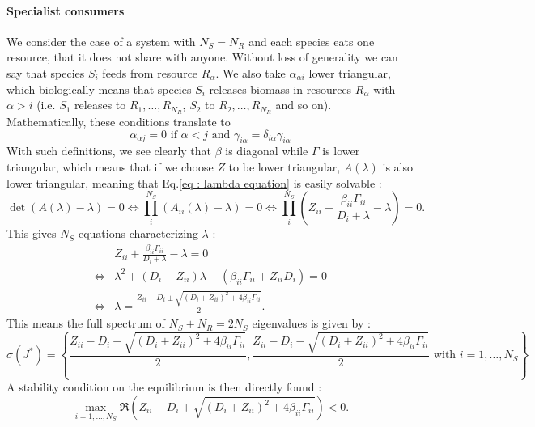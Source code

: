 \documentclass[12pt, titlepage]{report}
\begin{document}
		\paragraph{Specialist consumers} We consider the case of a system with $N_S = N_R$ and each species eats one resource, that it does not share with anyone. Without loss of generality we can say that species $S_i$ feeds from resource $R_\alpha$. We also take $\alpha_{\alpha i}$ lower triangular, which biologically means that species $S_i$ releases biomass in resources $R_\alpha$ with $\alpha > i$ (i.e. $S_1$ releases to $R_1, \dots, R_{N_R}$, $S_2$ to $R_2, \dots, R_{N_R}$ and so on). Mathematically, these conditions translate to
		\begin{equation}
			\alpha_{\alpha j} = 0 \text{ if } \alpha < j \text{ and } \gamma_{i\alpha} = \delta_{i\alpha} \gamma_{i\alpha}
		\end{equation}
		With such definitions, we see clearly that $\beta$ is diagonal while $\Gamma$ is lower triangular, which means that if we choose $Z$ to be lower triangular, $A(\lambda)$ is also lower triangular, meaning that Eq.\eqref{eq : lambda equation} is easily solvable :
		\begin{equation}
		\det\left(A(\lambda)-\lambda\right) = 0 \iff \prod_i^{N_S} \left(A_{ii}(\lambda)-\lambda\right)=0 \iff \prod_i^{N_S}\left(Z_{ii}+\frac{\beta_{ii}\Gamma_{ii}}{D_i + \lambda}-\lambda\right)=0.
		\end{equation}
		This gives $N_S$ equations characterizing $\lambda$ :
		\begin{align}
			& Z_{ii}+\frac{\beta_{ii}\Gamma_{ii}}{D_i + \lambda}-\lambda = 0 \\
			\iff & \lambda^2 + \left(D_i-Z_{ii}\right) \lambda-\left(\beta_{ii}\Gamma_{ii}+Z_{ii}D_i\right) = 0 \\
			\iff & \lambda = \frac{Z_{ii}-D_i \pm \sqrt{\left(D_i+Z_{ii}\right)^2 + 4 \beta_{ii} \Gamma_{ii}}}{2}.
		\end{align}
		This means the full spectrum of $N_S + N_R = 2 N_S$ eigenvalues is given by :
		\begin{equation}
			\sigma(J^*) = \left\{\frac{Z_{ii}-D_i + \sqrt{\left(D_i+Z_{ii}\right)^2 + 4 \beta_{ii} \Gamma_{ii}}}{2}, \frac{Z_{ii}-D_i - \sqrt{\left(D_i+Z_{ii}\right)^2 + 4 \beta_{ii} \Gamma_{ii}}}{2} \text{ with } i = 1, \dots, N_S\right\}
		\end{equation}
		A stability condition on the equilibrium is then directly found :
		\begin{equation}
			\max_{i = 1, \dots, N_S}\Re\left(Z_{ii}-D_i + \sqrt{\left(D_i+Z_{ii}\right)^2 + 4 \beta_{ii} \Gamma_{ii}}\right) < 0. \label{eq : stability condition}
		\end{equation}
\end{document}
